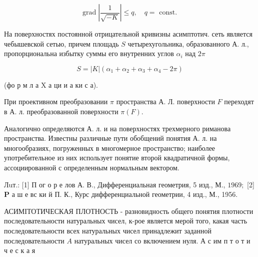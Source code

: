 \documentclass[10pt]{article}
\begin{document}
\[

\operatorname{grad}\left|\frac{1}{\sqrt{-K}}\right| \leqslant q, \quad q=\text { const. }

\]



На поверхностях постоянной отрицательной кривизны асимптотич. сеть является чебышевской сетью, причем площадь $S$ четырехугольника, образованного А. л., пропорциональна избытку суммы его внутренних углов $\alpha_{i}$ над $2 \pi$



\[

S=|K|\left(\alpha_{1}+\alpha_{2}+\alpha_{3}+\alpha_{4}-2 \pi\right)

\]



(фо р м л а X а ци и а ки с а).



При проективном преобразовании $\pi$ пространства А. Л. поверхности $F$ переходят в А. л. преобразованной поверхности $\pi(F)$.



Аналогично определяются А. л. и на поверхностях трехмерного риманова пространства. Известны различные пути обобщений понятия А. л. на многообразиях, погруженных в многомерное пространство; наиболее употребительное из них использует понятие второй квадратичной формы, ассоциированной с определенным нормальным вектором.



Лuт.: [1] П ог о р е лов А. В., Дифференциальная геометрия, 5 изд., М., $1969 ;$ [2] $\mathbf{P}$ а ш е вс ки й П. К., Курс дифференциальной геометрии, 4 изд., М., 1956.



АСИМІТОТИЧЕСКАЯ ПЛОТНОСТЬ - разновидность общего понятия плотности последовательности натуральных чисел, к-рое является мерой того, какая часть последовательности всех натуральных чисел принадлежит заданной последовательности $A$ натуральных чисел со включением нуля. А с им п т о т и ч е с к а я
\end{document}
